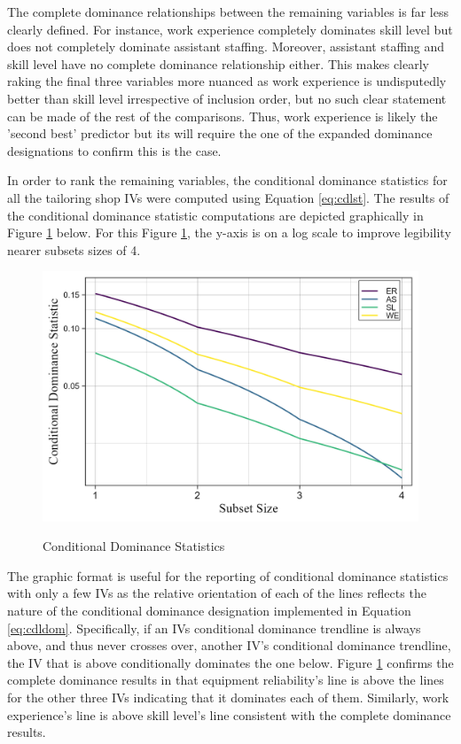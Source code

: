 \documentclass[ShortAfour,times,sageapa]{sagej}
\begin{document}
	The complete dominance relationships between the remaining variables is far less clearly defined. 
	For instance, work experience completely dominates skill level but does not completely dominate assistant staffing.
	Moreover, assistant staffing and skill level have no complete dominance relationship either.
	This makes clearly raking the final three variables more nuanced as work experience is undisputedly better than skill level irrespective of inclusion order, but no such clear statement can be made of the rest of the comparisons.
	Thus, work experience is likely the 'second best' predictor but its will require the one of the expanded dominance designations to confirm this is the case.
	
	In order to rank the remaining variables, the conditional dominance statistics for all the tailoring shop IVs were computed using Equation \ref{eq:cdlst}.
	The results of the conditional dominance statistic computations are depicted graphically in Figure \ref{fg:cdl} below.
	For this Figure \ref{fg:cdl}, the y-axis is on a log scale to improve legibility nearer subsets sizes of 4.
	
	\begin{figure}[h!]
		\centering
		\caption{\centering Conditional Dominance Statistics}
		\includegraphics{includes/condit_gph}
		\label{fg:cdl}
	\end{figure}

	The graphic format is useful for the reporting of conditional dominance statistics with only a few IVs as the relative orientation of each of the lines reflects the nature of the conditional dominance designation implemented in Equation \ref{eq:cdldom}.
	Specifically, if an IVs conditional dominance trendline is always above, and thus never crosses over, another IV's conditional dominance trendline, the IV that is above conditionally dominates the one below.
	Figure \ref{fg:cdl} confirms the complete dominance results in that equipment reliability's line is above the lines for the other three IVs indicating that it dominates each of them.
	Similarly, work experience's line is above skill level's line consistent with the complete dominance results.
	
\end{document}
